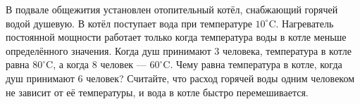 В подвале общежития установлен отопительный котёл, снабжающий горячей водой душевую. В котёл поступает вода при температуре $10^\circ\mathrm{C}$. Нагреватель постоянной мощности работает только когда температура воды в котле меньше определённого значения. Когда душ принимают $3$ человека, температура в котле равна $80^\circ\mathrm{C}$, а когда $8$ человек --- $60^\circ\mathrm{C}$. Чему равна температура в котле, когда душ принимают $6$ человек? Считайте, что расход горячей воды одним человеком не зависит от её температуры, и вода в котле быстро перемешивается.

